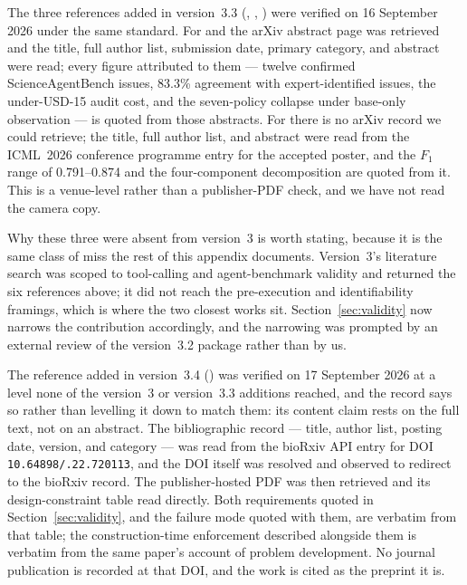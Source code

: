 \documentclass[11pt]{article}
\begin{document}
The three references added in version~3.3 (\cite{tu2026benchguard},
\cite{suh2026agentsuite}, \cite{luo2026identifiability}) were verified on
16 September 2026 under the same standard. For \cite{tu2026benchguard} and \cite{luo2026identifiability}
the arXiv abstract page was retrieved and the title, full author list,
submission date, primary category, and abstract were read; every figure
attributed to them --- twelve confirmed ScienceAgentBench issues, 83.3\%
agreement with expert-identified issues, the under-USD-15 audit cost, and the
seven-policy collapse under base-only observation --- is quoted from those
abstracts. For \cite{suh2026agentsuite} there is no arXiv record we could
retrieve; the title, full author list, and abstract were read from the ICML~2026
conference programme entry for the accepted poster, and the $F_1$ range of
0.791--0.874 and the four-component decomposition are quoted from it. This is a
venue-level rather than a publisher-PDF check, and we have not read the camera
copy.

Why these three were absent from version~3 is worth stating, because it is the
same class of miss the rest of this appendix documents. Version~3's literature
search was scoped to tool-calling and agent-benchmark validity and returned the
six references above; it did not reach the pre-execution and identifiability
framings, which is where the two closest works sit. Section~\ref{sec:validity}
now narrows the contribution accordingly, and the narrowing was prompted by an
external review of the version~3.2 package rather than by us.

The reference added in version~3.4 (\cite{li2026genebench}) was verified on
17 September 2026 at a level none of the version~3 or version~3.3 additions
reached, and the record says so rather than levelling it down to match them:
its content claim rests on the full text, not on an abstract. The bibliographic
record --- title, author list, posting date, version, and category --- was read
from the bioRxiv API entry for DOI \texttt{10.64898/.22.720113}, and the DOI itself was resolved and observed to redirect to
the bioRxiv record. The publisher-hosted PDF was then retrieved and its
design-constraint table read directly. Both requirements quoted in
Section~\ref{sec:validity}, and the failure mode quoted with them, are verbatim
from that table; the construction-time enforcement described alongside them is
verbatim from the same paper's account of problem development. No journal
publication is recorded at that DOI, and the work is cited as the preprint it
is.
\end{document}
